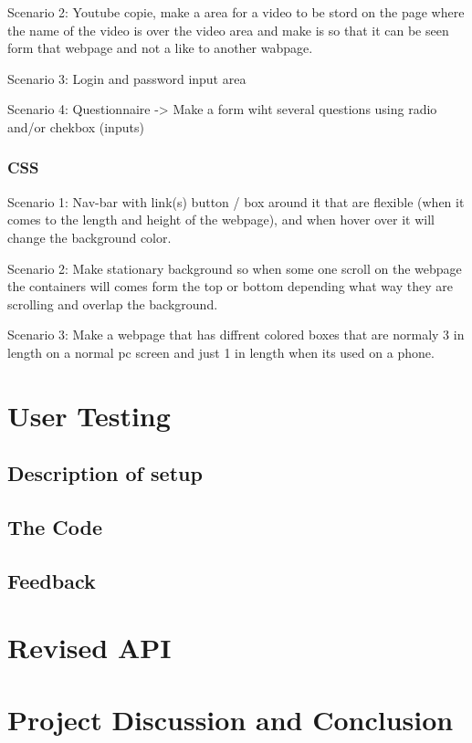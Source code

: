\documentclass[12pt]{article}
\begin{document}
    Scenario 2: Youtube copie, make a area for a video to be stord on the page where the name of the video is over the video area and make is so that it can be seen form that webpage and not a like to another wabpage.

    Scenario 3: Login and password input area

    Scenario 4: Questionnaire -> Make a form wiht several questions using radio and/or chekbox (inputs)

    \subsubsection{CSS}

    Scenario 1: Nav-bar with link(s) button / box around it that are flexible (when it comes to the length and height of the webpage), and when hover over it will change the background color.
        
    Scenario 2: Make stationary background so when some one scroll on the webpage the containers will comes form the top or bottom depending what way they are scrolling and overlap the background.

    Scenario 3: Make a webpage that has diffrent colored boxes that are normaly 3 in length on a normal pc screen and just 1 in length when its used on a phone.

\section{User Testing}

\subsection{Description of setup}

\subsection{The Code}

\subsection{Feedback}

\section{Revised API}

\section{Project Discussion and Conclusion}
\end{document}
